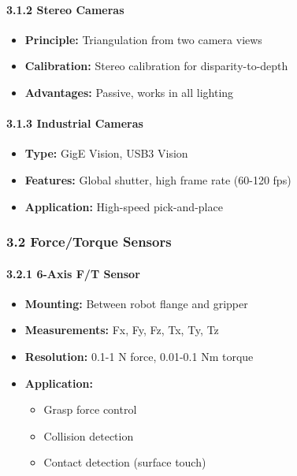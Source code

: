 \documentclass[
]{article}
\providecommand{\tightlist}{%
  \setlength{\itemsep}{0pt}\setlength{\parskip}{0pt}}
\begin{document}
\hypertarget{stereo-cameras}{%
\paragraph{3.1.2 Stereo Cameras}\label{stereo-cameras}}

\begin{itemize}
\tightlist
\item
  \textbf{Principle:} Triangulation from two camera views
\item
  \textbf{Calibration:} Stereo calibration for disparity-to-depth
\item
  \textbf{Advantages:} Passive, works in all lighting
\end{itemize}

\hypertarget{industrial-cameras}{%
\paragraph{3.1.3 Industrial Cameras}\label{industrial-cameras}}

\begin{itemize}
\tightlist
\item
  \textbf{Type:} GigE Vision, USB3 Vision
\item
  \textbf{Features:} Global shutter, high frame rate (60-120 fps)
\item
  \textbf{Application:} High-speed pick-and-place
\end{itemize}

\hypertarget{forcetorque-sensors}{%
\subsubsection{3.2 Force/Torque Sensors}\label{forcetorque-sensors}}

\hypertarget{axis-ft-sensor}{%
\paragraph{3.2.1 6-Axis F/T Sensor}\label{axis-ft-sensor}}

\begin{itemize}
\tightlist
\item
  \textbf{Mounting:} Between robot flange and gripper
\item
  \textbf{Measurements:} Fx, Fy, Fz, Tx, Ty, Tz
\item
  \textbf{Resolution:} 0.1-1 N force, 0.01-0.1 Nm torque
\item
  \textbf{Application:}

  \begin{itemize}
  \tightlist
  \item
    Grasp force control
  \item
    Collision detection
  \item
    Contact detection (surface touch)
  \end{itemize}
\end{itemize}
\end{document}
